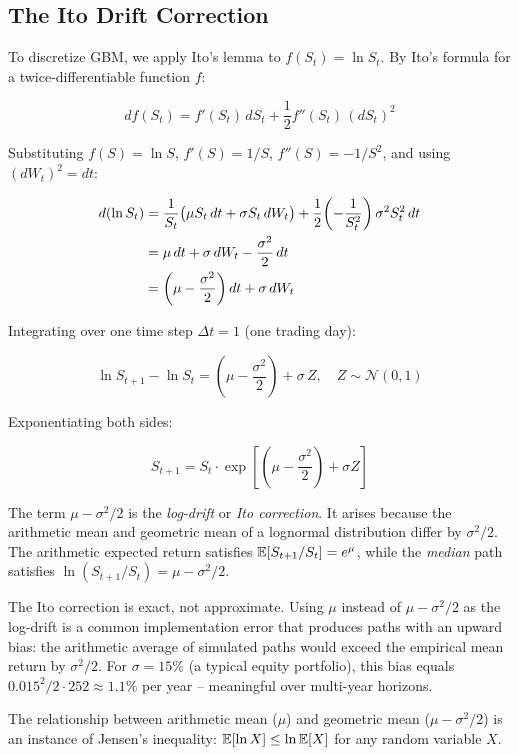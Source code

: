 \subsection{The Ito Drift Correction}

To discretize GBM, we apply Ito's lemma to $f(S_t) = \ln S_t$. By Ito's formula for a twice-differentiable function $f$:

\begin{equation}
  df(S_t) = f'(S_t)\,dS_t + \frac{1}{2}f''(S_t)\,(dS_t)^2
  \label{eq:ito-formula}
\end{equation}

Substituting $f(S) = \ln S$, $f'(S) = 1/S$, $f''(S) = -1/S^2$, and using $(dW_t)^2 = dt$:

\begin{align}
  d(\ln S_t) &= \frac{1}{S_t}\bigl(\mu S_t\,dt + \sigma S_t\,dW_t\bigr)
               + \frac{1}{2}\!\left(-\frac{1}{S_t^2}\right)\sigma^2 S_t^2\,dt \notag \\
             &= \mu\,dt + \sigma\,dW_t - \frac{\sigma^2}{2}\,dt \notag \\
             &= \left(\mu - \frac{\sigma^2}{2}\right)dt + \sigma\,dW_t
  \label{eq:ito-logprice}
\end{align}

Integrating over one time step $\Delta t = 1$ (one trading day):

\begin{equation}
  \ln S_{t+1} - \ln S_t = \left(\mu - \frac{\sigma^2}{2}\right) + \sigma\,Z, \quad Z \sim \mathcal{N}(0,1)
  \label{eq:gbm-discrete-log}
\end{equation}

Exponentiating both sides:

\begin{equation}
  S_{t+1} = S_t \cdot \exp\!\left[\left(\mu - \frac{\sigma^2}{2}\right) + \sigma Z\right]
  \label{eq:gbm-price-step}
\end{equation}

The term $\mu - \sigma^2/2$ is the \emph{log-drift} or \emph{Ito correction}. It arises because the arithmetic mean and geometric mean of a lognormal distribution differ by $\sigma^2/2$. The arithmetic expected return satisfies $\operatorname{\mathbb{E}}[S_{t+1}/S_t] = e^\mu$, while the \emph{median} path satisfies $\ln(S_{t+1}/S_t) = \mu - \sigma^2/2$.

\begin{keyinsight}
  The Ito correction is exact, not approximate. Using $\mu$ instead of $\mu - \sigma^2/2$ as the log-drift is a common implementation error that produces paths with an upward bias: the arithmetic average of simulated paths would exceed the empirical mean return by $\sigma^2/2$. For $\sigma = 15\%$ (a typical equity portfolio), this bias equals $0.015^2/2 \cdot 252 \approx 1.1\%$ per year -- meaningful over multi-year horizons.

  The relationship between arithmetic mean ($\mu$) and geometric mean ($\mu - \sigma^2/2$) is an instance of Jensen's inequality: $\operatorname{\mathbb{E}}[\ln X] \leq \ln \operatorname{\mathbb{E}}[X]$ for any random variable $X$.
\end{keyinsight}

